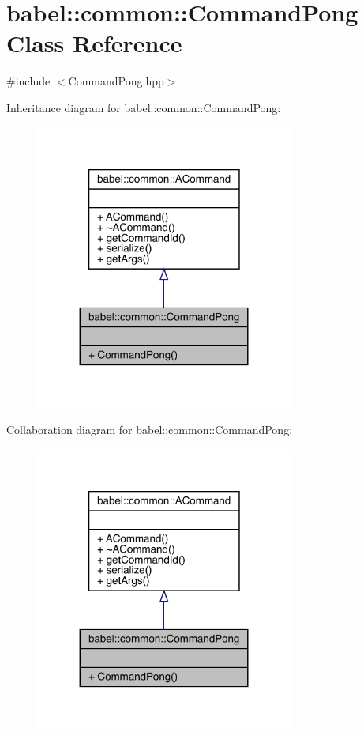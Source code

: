 \hypertarget{classbabel_1_1common_1_1_command_pong}{}\section{babel\+:\+:common\+:\+:Command\+Pong Class Reference}
\label{classbabel_1_1common_1_1_command_pong}


{\ttfamily \#include $<$Command\+Pong.\+hpp$>$}



Inheritance diagram for babel\+:\+:common\+:\+:Command\+Pong\+:\nopagebreak
\begin{figure}[H]
\begin{center}
\leavevmode
\includegraphics[width=239pt]{classbabel_1_1common_1_1_command_pong__inherit__graph}
\end{center}
\end{figure}


Collaboration diagram for babel\+:\+:common\+:\+:Command\+Pong\+:\nopagebreak
\begin{figure}[H]
\begin{center}
\leavevmode
\includegraphics[width=239pt]{classbabel_1_1common_1_1_command_pong__coll__graph}
\end{center}
\end{figure}
